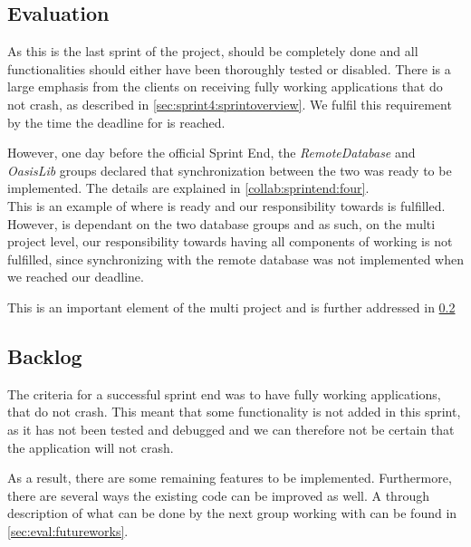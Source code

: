 \subsection{Evaluation}

As this is the last sprint of the project, \launcher should be completely done and all functionalities should either have been thoroughly tested or disabled.
There is a large emphasis from the clients on receiving  fully working applications that do not crash, as described in \cref{sec:sprint4:sprintoverview}.
We fulfil this requirement by the time the deadline for \launcher is reached.

However, one day before the official Sprint End, the \textit{RemoteDatabase} and \textit{OasisLib} groups declared that synchronization between the two was ready to be implemented.
The details are explained in \cref{collab:sprintend:four}.\\

This is an example of where \launcher is ready and our responsibility towards \launcher is fulfilled.
However, \launcher is dependant on the two database groups and as such, on the multi project level, our responsibility towards having all components of \launcher working is not fulfilled, since synchronizing with the remote database was not implemented when we reached our deadline.

This is an important element of the multi project and is further addressed in \cref{}

\subsection{Backlog}

The criteria for a successful sprint end was to have fully working applications, that do not crash.
This meant that some functionality is not added in this sprint, as it has not been tested and debugged and we can therefore not be certain that the application will not crash.

As a result, there are some remaining features to be implemented.
Furthermore, there are several ways the existing code can be improved as well.
A through description of what can be done by the next group working with \launcher can be found in \cref{sec:eval:futureworks}.